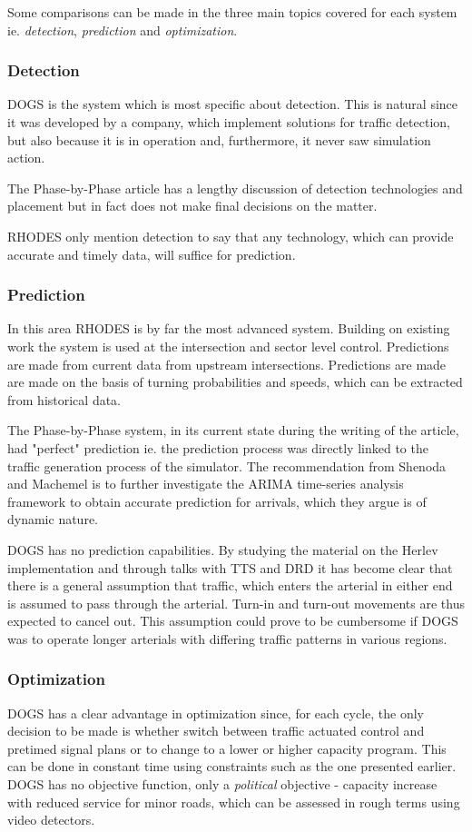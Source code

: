 Some comparisons can be made in the three main topics covered for each system ie. \textit{detection}, \textit{prediction} and \textit{optimization}.

\subsubsection*{Detection}
DOGS is the system which is most specific about detection. This is natural since it was developed by a company, which implement solutions for traffic detection, but also because it is in operation and, furthermore, it never saw simulation action.

The Phase-by-Phase article has a lengthy discussion of detection technologies and placement but in fact does not make final decisions on the matter.

RHODES only mention detection to say that any technology, which can provide accurate and timely data, will suffice for prediction.

\subsubsection*{Prediction}
In this area RHODES is by far the most advanced system. Building on existing work the system is used at the intersection and sector level control. Predictions are made from current data from upstream intersections. Predictions are made are made on the basis of turning probabilities and speeds, which can be extracted from historical data.

The Phase-by-Phase system, in its current state during the writing of the article, had "perfect" prediction ie. the prediction process was directly linked to the traffic generation process of the simulator. The recommendation from Shenoda and Machemel is to further investigate the ARIMA time-series analysis framework to obtain accurate prediction for arrivals, which they argue is of dynamic nature.

DOGS has no prediction capabilities. By studying the material on the Herlev implementation and through talks with TTS and DRD it has become clear that there is a general assumption that traffic, which enters the arterial in either end is assumed to pass through the arterial. Turn-in and turn-out movements are thus expected to cancel out. This assumption could prove to be cumbersome if DOGS was to operate longer arterials with differing traffic patterns in various regions.

\subsubsection*{Optimization}
DOGS has a clear advantage in optimization since, for each cycle, the only decision to be made is whether switch between traffic actuated control and pretimed signal plans or to change to a lower or higher capacity program. This can be done in constant time using constraints such as the one presented earlier. DOGS has no objective function, only a \textit{political} objective - capacity increase with reduced service for minor roads, which can be assessed in rough terms using video detectors.

